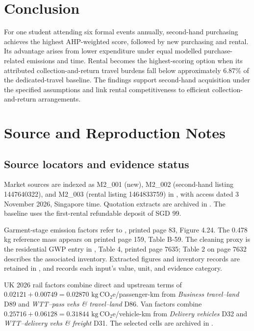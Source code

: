 \documentclass[11pt,a4paper]{article}
\newcommand{\co}{\ensuremath{\mathrm{kg\,CO_2e}}}
\begin{document}
\section{Conclusion}
For one student attending six formal events annually, second-hand purchasing achieves the highest AHP-weighted score, followed by new purchasing and rental. Its advantage arises from lower expenditure under equal modelled purchase-related emissions and time. Rental becomes the highest-scoring option when its attributed collection-and-return travel burdens fall below approximately 6.87\% of the dedicated-travel baseline. The findings support second-hand acquisition under the specified assumptions and link rental competitiveness to efficient collection-and-return arrangements.

\clearpage

\clearpage
\appendix
\section{Source and Reproduction Notes}\label{app:audit}
\subsection{Source locators and evidence status}
Market sources are indexed as M2\_001 (new), M2\_002 (second-hand listing 1447640322), and M2\_003 (rental listing 1464833759) in , with access dated 3 November 2026, Singapore time. Quotation extracts are archived in . The baseline uses the first-rental refundable deposit of SGD 99.

Garment-stage emission factors refer to \citet{sandin2019}, printed page 83, Figure 4.24. The 0.478 kg reference mass appears on printed page 159, Table B-59. The cleaning proxy is the residential GWP entry in \citet{monticelli2023}, Table 4, printed page 7635; Table 2 on page 7632 describes the associated inventory. Extracted figures and inventory records are retained in , and  records each input's value, unit, and evidence category.

UK 2026 rail factors combine direct and upstream terms of $0.02121+0.00749=0.02870$ \co/passenger-km from \textit{Business travel--land} D89 and \textit{WTT--pass vehs \& travel--land} D86. Van factors combine $0.25716+0.06128=0.31844$ \co/vehicle-km from \textit{Delivery vehicles} D32 and \textit{WTT--delivery vehs \& freight} D31. The selected cells are archived in .
\end{document}
